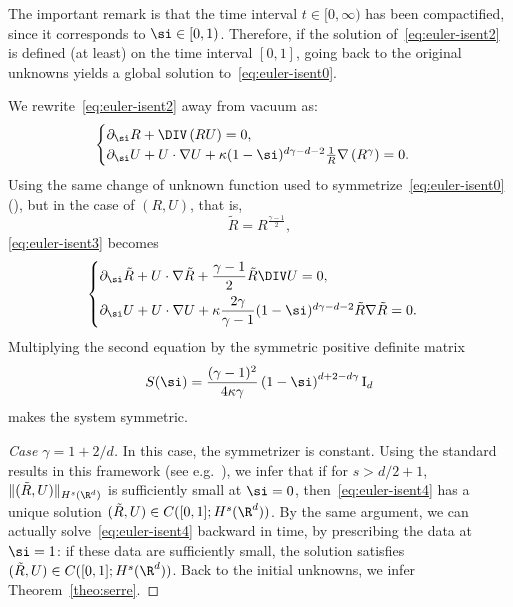 The important remark is that the time interval $t\in [0,\infty)$ has been compactified, since it corresponds to $\si\in [0,1)$. Therefore, if the solution of~\eqref{eq:euler-isent2} is defined (at least) on the time interval $[0,1]$, going back to the original unknowns yields a global solution to~\eqref{eq:euler-isent0}.

We rewrite~\eqref{eq:euler-isent2} away from vacuum as:
\begin{equation}\label{eq:euler-isent3}
\begin{cases}
\partial_\si R+\DIV\left(RU\right)=0,\\
\partial_\si U +U\cdot\nabla U+\kappa(1-\si)^{d\gamma-d-2}\frac{1}{R}\nabla
\left(R^\gamma\right)= 0.
\end{cases}
\end{equation}
Using the same change of unknown function used to symmetrize~\eqref{eq:euler-isent0} (\cite{MUK86,JYC90}), but in the case of $(R,U)$, that is,
\begin{equation*}
\tilde R = R^{\frac{\gamma-1}{2}},
\end{equation*}
\eqref{eq:euler-isent3} becomes
\begin{equation}\label{eq:euler-isent4}
\begin{cases}
\partial_\si \tilde R+U\cdot \nabla \tilde R +\dfrac{\gamma-1}{2}\tilde R \DIV U=0,\\[0.75em]
\partial_\si U+U\cdot\nabla U+\kappa \dfrac{2\gamma}{\gamma-1}(1-\si)^{d\gamma-d-2}\tilde R \nabla \tilde R= 0.
\end{cases}
\end{equation}
Multiplying the second equation by the symmetric positive definite matrix
\begin{equation*}
S(\si) =
\frac{(\gamma-1)^2}{4\kappa\gamma}\left(1-\si\right)^{d+2-d\gamma}{\mathrm I}_d
\end{equation*}
makes the system symmetric.

\begin{proof}[Case $\gamma=1+2/d$]
In this case, the symmetrizer is constant. Using the standard results in this framework (see e.g.~\cite{Majda,Taylor3}), we infer that if for $s>d/2+1$, $\|(\tilde R,U)\|_{H^s(\R^d)}$ is sufficiently small at $\si=0$, then~\eqref{eq:euler-isent4} has a unique solution $(\tilde R,U)\in C([0,1];H^s(\R^d))$. By the same argument, we can actually solve~\eqref{eq:euler-isent4} backward in time, by prescribing the data at $\si=1$: if these data are sufficiently small, the solution satisfies $(\tilde R,U)\in C([0,1];H^s(\R^d))$. Back to the initial unknowns, we infer Theorem~\ref{theo:serre}.
\let\qed\relax
\end{proof}

